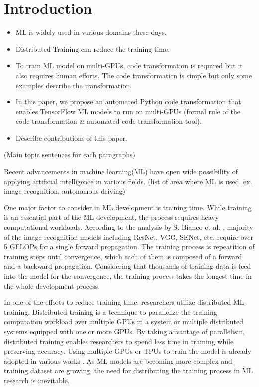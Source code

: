 \section{Introduction}\label{sec:intro}
\begin{itemize}
  \item ML is widely used in various domains these days.
  \item Distributed Training can reduce the training time.
  \item To train ML model on multi-GPUs, code transformation is required but it
    also requires human efforts. The code transformation is simple but only
    some examples describe the transformation.
  \item In this paper, we propose an automated Python code transformation that
    enables TensorFlow ML models to run on multi-GPUs (formal rule of the code
    transformation \& automated code transformation tool).
  \item Describe contributions of this paper.
\end{itemize}

(Main topic sentences for each paragraphs)

Recent advancements in machine learning(ML) have open wide possibility of
applying artificial intelligence in various fields.
(list of area where ML is used. ex. image recognition, autonomous driving)

One major factor to consider in ML development is training time.
While training is an essential part of the ML development,
the process requires heavy computational workloads.
According to the analysis by S. Bianco et al. \cite{bianco2018benchmark},
majority of the image recognition models including ResNet, VGG, SENet, etc.
require over 5 GFLOPs for a single forward propagation.
The training process is repeatition of training steps until convergence,
which each of them is composed of a forward and a backward propagation.
Considering that thousands of training data is feed into the model
for the convergence, the training process takes the longest time
in the whole development process.

In one of the efforts to reduce training time, 
researchers utilize distributed ML training.
Distributed training is a technique to parallelize the training computation
workload over multiple GPUs in a system or multiple distributed systems
equipped with one or more GPUs.
By taking advantage of parallelism, distributed training enables researchers
to spend less time in training while preserving accuracy.
Using multiple GPUs or TPUs to train the model is already adopted
in various works \cite{brown2020gpt-3} \cite{silver2017alphazero}
\cite{zhang2019distrspeech} \cite{tian2020distrwebattack}.
As ML models are becoming more complex and training dataset are growing,
the need for distributing the training process in ML research is inevitable.

